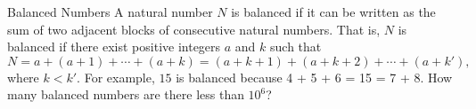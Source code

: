 \begin{problem}{Balanced Numbers}
    A natural number $N$ is balanced if it can be written as the sum of two adjacent blocks of consecutive natural numbers. That is, $N$ is balanced if there exist positive integers $a$ and $k$ such that
    \[
    N = a + (a+1) + \cdots + (a+k) = (a+k+1) + (a+k+2) + \cdots + (a+k'),
    \]
    where $k < k'$. For example, $15$ is balanced because 4 + 5 + 6 = 15 = 7 + 8.
    How many balanced numbers are there less than $10^6$?
\end{problem}
